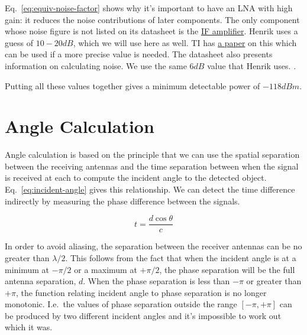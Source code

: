 Eq.~\ref{eq:equiv-noise-factor} shows why it's important to have an LNA with high gain: it reduces
the noise contributions of later components. The only component whose noise figure is not listed on
its datasheet is the \hyperref[sec:ada4940-2]{IF amplifier}. Henrik uses a guess of
$10 - 20 \si{dB}$, which we will use here as well. TI has
\href{http://www.ti.com/lit/an/slyt094/slyt094.pdf}{a paper} on this which can be used if a more
precise value is needed. The datasheet also presents information on calculating noise. We use the
same $6 \si{dB}$ value that Henrik uses. .

Putting all these values together gives a minimum detectable power of $-118 \si{dBm}$.

\section{Angle Calculation}
\label{sec:angle}


Angle calculation is based on the principle that we can use the spatial separation between the
receiving antennas and the time separation between when the signal is received at each to compute
the incident angle to the detected object. Eq.~\ref{eq:incident-angle} gives this relationship. We
can detect the time difference indirectly by measuring the phase difference between the signals.

\begin{equation}
        \label{eq:incident-angle}
        t = \frac{d\cos\theta}{c}
\end{equation}

In order to avoid aliasing, the separation between the receiver antennas can be no greater than
$\lambda/2$. This follows from the fact that when the incident angle is at a minimum at $-\pi/2$ or
a maximum at $+\pi/2$, the phase separation will be the full antenna separation, $d$. When the phase
separation is less than $-\pi$ or greater than $+\pi$, the function relating incident angle to phase
separation is no longer monotonic. I.e.\ the values of phase separation outside the range
$[-\pi, +\pi]$ can be produced by two different incident angles and it's impossible to work out
which it was. 

